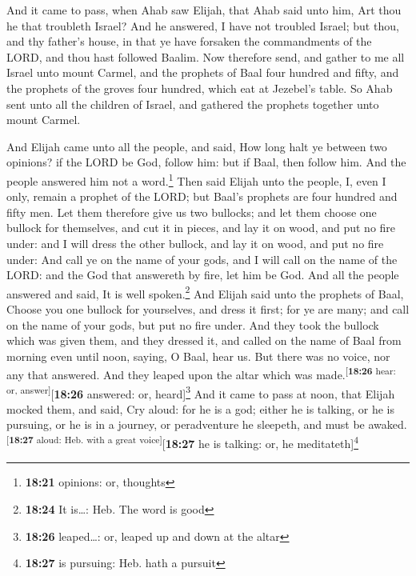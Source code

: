  And it came to pass, when Ahab saw Elijah, that Ahab
said unto him, Art thou he that troubleth Israel?  And he
answered, I have not troubled Israel; but thou, and thy father's house,
in that ye have forsaken the commandments of the LORD, and thou hast
followed Baalim.  Now therefore send, and gather to me
all Israel unto mount Carmel, and the prophets of Baal four hundred and
fifty, and the prophets of the groves four hundred, which eat at
Jezebel's table.  So Ahab sent unto all the children of
Israel, and gathered the prophets together unto mount Carmel.

 And Elijah came unto all the people, and said, How long
halt ye between two opinions? if the LORD be God, follow him: but if
Baal, then follow him. And the people answered him not a
word.\footnote{\textbf{18:21} opinions: or, thoughts} 
Then said Elijah unto the people, I, even I only, remain a prophet of
the LORD; but Baal's prophets are four hundred and fifty men.
 Let them therefore give us two bullocks; and let them
choose one bullock for themselves, and cut it in pieces, and lay it on
wood, and put no fire under: and I will dress the other bullock, and lay
it on wood, and put no fire under:  And call ye on the
name of your gods, and I will call on the name of the LORD: and the God
that answereth by fire, let him be God. And all the people answered and
said, It is well spoken.\footnote{\textbf{18:24} It is\ldots: Heb. The
  word is good}  And Elijah said unto the prophets of
Baal, Choose you one bullock for yourselves, and dress it first; for ye
are many; and call on the name of your gods, but put no fire under.
 And they took the bullock which was given them, and they
dressed it, and called on the name of Baal from morning even until noon,
saying, O Baal, hear us. But there was no voice, nor any that answered.
And they leaped upon the altar which was
made.\textsuperscript{{[}\textbf{18:26} hear: or,
answer{]}}{[}\textbf{18:26} answered: or, heard{]}\footnote{\textbf{18:26}
  leaped\ldots: or, leaped up and down at the altar}  And
it came to pass at noon, that Elijah mocked them, and said, Cry aloud:
for he is a god; either he is talking, or he is pursuing, or he is in a
journey, or peradventure he sleepeth, and must be
awaked.\textsuperscript{{[}\textbf{18:27} aloud: Heb. with a great
voice{]}}{[}\textbf{18:27} he is talking: or, he
meditateth{]}\footnote{\textbf{18:27} is pursuing: Heb. hath a pursuit}
